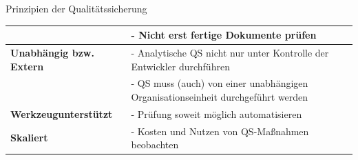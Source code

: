 \begin{defi}{Prinzipien der Qualitätssicherung}
\begin{tabularx}{\textwidth}{|>{\bfseries}l|>{- }X|}
                               & Nicht erst fertige Dokumente prüfen                                                                                                                                                                      \\
        \hline
        Unabhängig bzw. Extern & Analytische QS nicht nur unter Kontrolle der Entwickler durchführen                                                                                                                                      \\
                               & QS muss (auch) von einer unabhängigen Organisationseinheit durchgeführt werden                                                                                                                           \\
        \hline
        Werkzeugunterstützt    & Prüfung soweit möglich automatisieren                                                                                                                                                                    \\
        \hline
        Skaliert               & Kosten und Nutzen von QS-Maßnahmen beobachten                                                                                                                                                            \\
        \hline
    \end{tabularx}
\end{defi}

